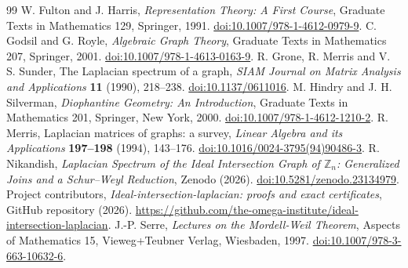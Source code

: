 \begin{thebibliography}{99}
W. Fulton and J. Harris, \emph{Representation Theory: A First Course},
Graduate Texts in Mathematics 129, Springer, 1991.
\href{https://doi.org/10.1007/978-1-4612-0979-9}{doi:10.1007/978-1-4612-0979-9}.
C. Godsil and G. Royle, \emph{Algebraic Graph Theory},
Graduate Texts in Mathematics 207, Springer, 2001.
\href{https://doi.org/10.1007/978-1-4613-0163-9}{doi:10.1007/978-1-4613-0163-9}.
R. Grone, R. Merris and V. S. Sunder, The Laplacian spectrum of a graph,
\emph{SIAM Journal on Matrix Analysis and Applications} \textbf{11} (1990), 218--238.
\href{https://doi.org/10.1137/0611016}{doi:10.1137/0611016}.
M. Hindry and J. H. Silverman, \emph{Diophantine Geometry: An Introduction},
Graduate Texts in Mathematics 201, Springer, New York, 2000.
\href{https://doi.org/10.1007/978-1-4612-1210-2}{doi:10.1007/978-1-4612-1210-2}.
R. Merris, Laplacian matrices of graphs: a survey,
\emph{Linear Algebra and its Applications} \textbf{197--198} (1994), 143--176.
\href{https://doi.org/10.1016/0024-3795(94)90486-3}{doi:10.1016/0024-3795(94)90486-3}.
R. Nikandish,
\emph{Laplacian Spectrum of the Ideal Intersection Graph of $\mathbb Z_n$:
Generalized Joins and a Schur--Weyl Reduction}, Zenodo (2026).
\href{https://doi.org/10.5281/zenodo.23134979}{doi:10.5281/zenodo.23134979}.
Project contributors, \emph{Ideal-intersection-laplacian: proofs and exact certificates},
GitHub repository (2026).
\url{https://github.com/the-omega-institute/ideal-intersection-laplacian}.
J.-P. Serre, \emph{Lectures on the Mordell-Weil Theorem},
Aspects of Mathematics 15, Vieweg+Teubner Verlag, Wiesbaden, 1997.
\href{https://doi.org/10.1007/978-3-663-10632-6}{doi:10.1007/978-3-663-10632-6}.
\end{thebibliography}
\endgroup

